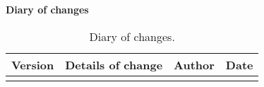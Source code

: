 \textbf{\Large Diary of changes}
\vspace{0.5cm}
\small
\begin{longtable}{|c|m{4cm}|>{\centering}m{2.7cm}|c|}
\hline 
\textbf{Version} & \textbf{Details of change} & \textbf{Author} & \textbf{Date}\\ \hline \endhead

\caption{Diary of changes.}
\label{tabella:diarioModifiche}
\end{longtable}
\clearpage

